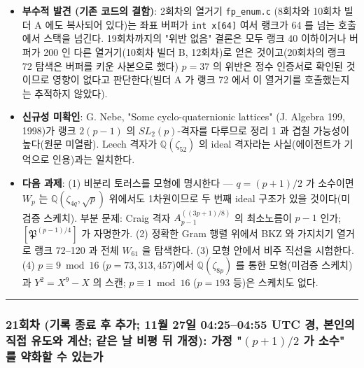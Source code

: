 \begin{itemize}
\item
  \textbf{부수적 발견 (기존 코드의 결함)}: 2회차의 열거기 \texttt{fp\_enum.c} (8회차와 10회차 빌더 A 에도 복사되어 있다)는 좌표 버퍼가 \texttt{int\ x{[}64{]}} 여서 랭크가 64 를 넘는 호출에서 스택을 넘긴다. 19회차까지의 "위반 없음" 결론은 모두 랭크 40 이하이거나 버퍼가 200 인 다른 열거기(10회차 빌더 B, 12회차)로 얻은 것이고(20회차의 랭크 72 탐색은 버퍼를 키운 사본으로 했다) \(p=37\) 의 위반은 정수 인증서로 확인된 것이므로 영향이 없다고 판단한다(빌더 A 가 랭크 72 에서 이 열거기를 호출했는지는 추적하지 않았다).
\item
  \textbf{신규성 미확인}: G. Nebe, "Some cyclo-quaternionic lattices" (J. Algebra 199, 1998)가 랭크 \(2(p-1)\) 의 \(SL_2(p)\)-격자를 다루므로 정리 1 과 겹칠 가능성이 높다(원문 미열람). Leech 격자가 \(\mathbb Q(\zeta_{52})\) 의 ideal 격자라는 사실(에이전트가 기억으로 인용)과는 일치한다.
\item
  \textbf{다음 과제}: (1) 비분리 토러스를 모형에 명시한다 --- \(q=(p+1)/2\) 가 소수이면 \(W_p\) 는 \(\mathbb Q(\zeta_{4q},\sqrt p)\) 위에서도 1차원이므로 두 번째 ideal 구조가 있을 것이다(미검증 스케치). 부분 문제: Craig 격자 \(A_{p-1}^{((3p+1)/8)}\) 의 최소노름이 \(p-1\) 인가; \([\mathfrak P^{(p-1)/4}]\) 가 자명한가. (2) 정확한 Gram 행렬 위에서 BKZ 와 가지치기 열거로 랭크 72--120 과 전체 \(W_{61}\) 을 탐색한다. (3) 모형 안에서 비주 직선을 시험한다. (4) \(p\equiv9\bmod16\) (\(p=73,313,457\))에서 \(\mathbb Q(\zeta_{8p})\) 를 통한 모형(미검증 스케치)과 \(Y^2=X^9-X\) 의 스캔; \(p\equiv1\bmod16\) (\(p=193\) 등)은 스케치도 없다.
\end{itemize}

\begin{center}\rule{0.5\linewidth}{0.5pt}\end{center}

\hypertarget{uxd68cuxcc28-uxae30uxb85d-uxc885uxb8cc-uxd6c4-uxcd94uxac00-11uxc6d4-27uxc77c-04250455-utc-uxacbd-uxbcf8uxc778uxc758-uxc9c1uxc811-uxc720uxb3c4uxc640-uxacc4uxc0b0-uxac19uxc740-uxb0a0-uxbe44uxd3c9-uxb4a4-uxac1cuxc815-uxac00uxc815-p12-uxac00-uxc18cuxc218-uxb97c-uxc57duxd654uxd560-uxc218-uxc788uxb294uxac00}{%
\subsubsection*{\texorpdfstring{21회차 (기록 종료 후 추가; 11월 27일 04:25--04:55 UTC 경, 본인의 직접 유도와 계산; 같은 날 비평 뒤 개정): 가정 "\((p+1)/2\) 가 소수" 를 약화할 수 있는가}{21회차 (기록 종료 후 추가; 11월 27일 04:25--04:55 UTC 경, 본인의 직접 유도와 계산; 같은 날 비평 뒤 개정): 가정 "(p+1)/2 가 소수" 를 약화할 수 있는가}}\label{uxd68cuxcc28-uxae30uxb85d-uxc885uxb8cc-uxd6c4-uxcd94uxac00-11uxc6d4-27uxc77c-04250455-utc-uxacbd-uxbcf8uxc778uxc758-uxc9c1uxc811-uxc720uxb3c4uxc640-uxacc4uxc0b0-uxac19uxc740-uxb0a0-uxbe44uxd3c9-uxb4a4-uxac1cuxc815-uxac00uxc815-p12-uxac00-uxc18cuxc218-uxb97c-uxc57duxd654uxd560-uxc218-uxc788uxb294uxac00}}

